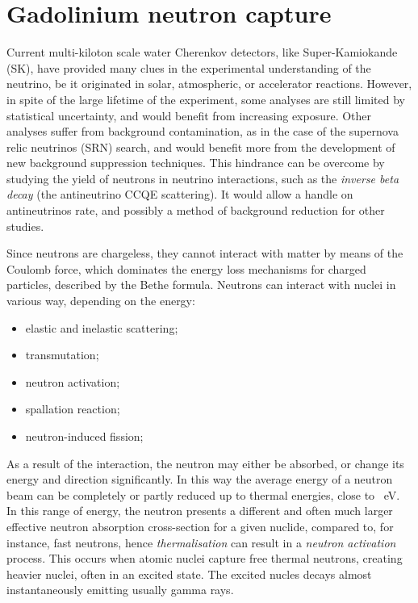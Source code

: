\section{Gadolinium neutron capture}
\label{sec:gdcap}

Current multi-kiloton scale water Cherenkov detectors, like Super-Kamiokande (SK), have provided %
many clues in the experimental understanding of the neutrino, be it originated in solar, atmospheric, or %
accelerator reactions.
However, in spite of the large lifetime of the experiment, some analyses are still limited by statistical uncertainty, %
and would benefit from increasing exposure.
Other analyses suffer from background contamination, as in the case of the supernova relic neutrinos (SRN) search, %
and would benefit more from the development of new background suppression techniques.
This hindrance can be overcome by studying the yield of neutrons in neutrino interactions, such as the %
\emph{inverse beta decay} (the antineutrino CCQE scattering).
It would allow a handle on antineutrinos rate, and possibly a method of background reduction for other studies.

Since neutrons are chargeless, they cannot interact with matter by means of the Coulomb force, %
which dominates the energy loss mechanisms for charged particles, described by the Bethe formula.
Neutrons can interact with nuclei in various way, depending on the energy:
\begin{itemize}
	\item elastic and inelastic scattering;
	\item transmutation;
	\item neutron activation;
	\item spallation reaction;
	\item neutron-induced fission;
\end{itemize}

As a result of the interaction, the neutron may either be absorbed, or change its energy and direction significantly.
In this way the average energy of a neutron beam can be completely or partly reduced up to thermal energies, %
close to ~eV.
In this range of energy, the neutron presents a different and often much larger effective neutron absorption %
cross-section for a given nuclide, compared to, for instance, fast neutrons, hence \emph{thermalisation} can %
result in a \emph{neutron activation} process.
This occurs when atomic nuclei capture free thermal neutrons, creating heavier nuclei, often in an excited state.
The excited nucles decays almost instantaneously emitting usually gamma rays.

